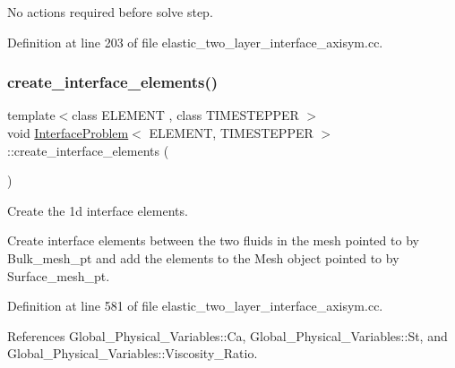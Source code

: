 No actions required before solve step. 



Definition at line 203 of file elastic\+\_\+two\+\_\+layer\+\_\+interface\+\_\+axisym.\+cc.

\mbox{\label{classInterfaceProblem_a94e2cc71fe27c0c329030874e05734b8}} 
\subsubsection{\texorpdfstring{create\+\_\+interface\+\_\+elements()}{create\_interface\_elements()}}
{\footnotesize\ttfamily template$<$class E\+L\+E\+M\+E\+NT , class T\+I\+M\+E\+S\+T\+E\+P\+P\+ER $>$ \\
void \hyperlink{classInterfaceProblem}{Interface\+Problem}$<$ E\+L\+E\+M\+E\+NT, T\+I\+M\+E\+S\+T\+E\+P\+P\+ER $>$\+::create\+\_\+interface\+\_\+elements (\begin{DoxyParamCaption}{ }\end{DoxyParamCaption})\hspace{0.3cm}{\ttfamily [private]}}



Create the 1d interface elements. 

Create interface elements between the two fluids in the mesh pointed to by Bulk\+\_\+mesh\+\_\+pt and add the elements to the Mesh object pointed to by Surface\+\_\+mesh\+\_\+pt. 

Definition at line 581 of file elastic\+\_\+two\+\_\+layer\+\_\+interface\+\_\+axisym.\+cc.



References Global\+\_\+\+Physical\+\_\+\+Variables\+::\+Ca, Global\+\_\+\+Physical\+\_\+\+Variables\+::\+St, and Global\+\_\+\+Physical\+\_\+\+Variables\+::\+Viscosity\+\_\+\+Ratio.

\mbox{\label{classInterfaceProblem_aa93d492461ac53f0d9f88516bce322dc}} 
